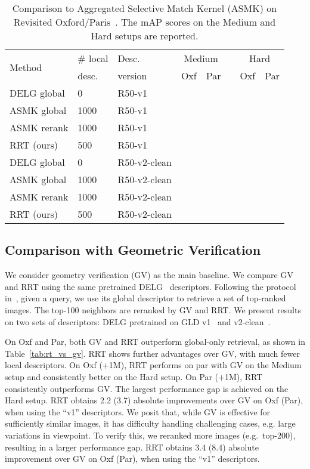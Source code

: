 \begin{table}[t]
\scalebox{0.88} {
\setlength{\tabcolsep}{2pt}
\centering
{
\begin{tabular}{l l l c c c c c}
\toprule
\multirow{2}{*}{Method} & \# local & Desc. & \multicolumn{2}{c}{ Medium} && \multicolumn{2}{c}{ Hard} \\
& desc. &version & \multicolumn{1}{c}{\normalsize \vphantom{M} \normalsize Oxf } & \multicolumn{1}{c}{\normalsize Par} && \multicolumn{1}{c}{\normalsize Oxf} &  \multicolumn{1}{c}{\normalsize Par}\\
\midrule
DELG global & 0 & R50-v1 &  &  & &  & \\
ASMK global & 1000 & R50-v1 &  &  &&  & \\
ASMK rerank & 1000 & R50-v1 &  &  &&  & \\
RRT (ours) & 500 & R50-v1 &  &  &&  & \\
\midrule
DELG global & 0 & R50-v2-clean &  &  &&  & \\
ASMK global & 1000 & R50-v2-clean &  &  &&  & \\
ASMK rerank & 1000 & R50-v2-clean &  &  &&  & \\
RRT (ours) & 500 & R50-v2-clean &  &  &&  & \\
\bottomrule
\end{tabular}
}
}
\vspace{-0.5em}
\caption{Comparison to Aggregated Selective Match Kernel (ASMK) on Revisited Oxford/Paris~\cite{revisited}. 
The mAP scores on the Medium and Hard setups are reported.
\vspace{-1.5em}
}
\label{tab:rt_vs_asmk}
\end{table}

\subsection{Comparison with Geometric Verification}
We consider geometry verification (GV) as the main baseline.
We compare GV and RRT using the same pretrained DELG~\cite{delg2020} descriptors.
Following the protocol in~\cite{delg2020}, given a query, we use its global descriptor to retrieve a set of top-ranked images. 
The top-100 neighbors are reranked by GV and RRT.
We present results on two sets of descriptors: DELG pretrained on GLD v1~\cite{delf2017} and v2-clean~\cite{gldv2}.

On Oxf and Par, both GV and RRT outperform global-only retrieval, as shown in Table~\ref{tab:rt_vs_gv}. 
RRT shows further advantages over GV, with much fewer local descriptors. 
On Oxf (+1M), RRT performs on par with GV on the Medium setup and consistently better on the Hard setup.
On Par (+1M), RRT consistently outperforms GV.
The largest performance gap is achieved on the Hard setup.
RRT obtains 2.2 (3.7) absolute improvements over GV on Oxf (Par), when using the ``v1'' descriptors.
We posit that, while GV is effective for sufficiently similar images, it has difficulty handling challenging cases, e.g. large variations in viewpoint.
To verify this, we reranked more images (e.g.~top-200), resulting in a larger performance gap.
RRT obtains 3.4 (8.4) absolute improvement over GV on Oxf (Par), when using the ``v1'' descriptors.


